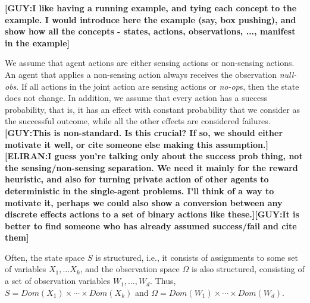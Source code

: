 \documentclass[letterpaper]{article} %
\newcommand{\eliran}[1]{\textbf{[\color{red}ELIRAN:#1]}}
\newcommand{\guy}[1]{\textbf{[\color{orange}GUY:#1]}}
\begin{document}

\guy{I like having a running example, and tying each concept to the example. I would introduce here the example (say, box pushing), and show how all the concepts - states, actions, observations, ..., manifest in the example}


We assume that agent actions are either sensing actions or non-sensing actions. An agent that applies a non-sensing action always receives the observation {\em null-obs}. If all actions in the joint action are sensing actions or {\em no-op}s, then the state does not change. In addition, we assume that every action has a success probability, that is, it has an effect with constant probability that we consider as the successful outcome, while all the other effects are considered failures.
\guy{This is non-standard. Is this crucial? If so, we should either motivate it well, or cite someone else making this assumption.}\eliran{I guess you're talking only about the success prob thing, not the sensing/non-sensing separation. We need it mainly for the reward heuristic, and also for turning private action of other agents to deterministic in the single-agent problems. I'll think of a way to motivate it, perhaps we could also show a conversion between any discrete effects actions to a set of binary actions like these.}\guy{It is better to find someone who has already assumed success/fail and cite them}

Often, the state space $S$ is structured, i.e., it consists of assignments to some set of variables $X_1,\ldots X_k$, and the observation space $\Omega$ is
also structured, consisting of a set of observation variables $W_1,\ldots, W_d$. 
Thus, $S=Dom(X_1)\times\cdots\times Dom(X_k)$ and
$\Omega = Dom(W_1)\times\cdots\times Dom(W_d)$. 
\end{document}
